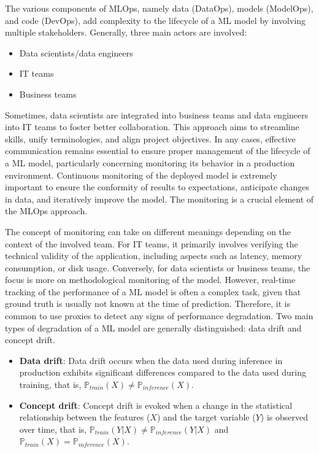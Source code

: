 The various components of MLOps, namely data (DataOps), models (ModelOps), and code (DevOps), add complexity to the lifecycle of a ML model by involving multiple stakeholders. Generally, three main actors are involved:

\begin{itemize}
    \item Data scientists/data engineers
    \item IT teams
    \item Business teams
\end{itemize}

Sometimes, data scientists are integrated into business teams and data engineers into IT teams to foster better collaboration. This approach aims to streamline skills, unify terminologies, and align project objectives. In any cases, effective communication remains essential to ensure proper management of the lifecycle of a ML model, particularly concerning monitoring its behavior in a production environment. Continuous monitoring of the deployed model is extremely important to ensure the conformity of results to expectations, anticipate changes in data, and iteratively improve the model. The monitoring is a crucial element of the MLOps approach.

The concept of monitoring can take on different meanings depending on the context of the involved team. For IT teams, it primarily involves verifying the technical validity of the application, including aspects such as latency, memory consumption, or disk usage. Conversely, for data scientists or business teams, the focus is more on methodological monitoring of the model. However, real-time tracking of the performance of a ML model is often a complex task, given that ground truth is usually not known at the time of prediction. Therefore, it is common to use proxies to detect any signs of performance degradation. Two main types of degradation of a ML model are generally distinguished: data drift and concept drift.

\begin{itemize}
    \item \textbf{Data drift}: Data drift occurs when the data used during inference in production exhibits significant differences compared to the data used during training, that is,  $\mathds{P}_{train}(X) \neq \mathds{P}_{inference}(X)$.
    \item \textbf{Concept drift}: Concept drift is evoked when a change in the statistical relationship between the features ($X$) and the target variable ($Y$) is observed over time, that is, $\mathds{P}_{train}(Y|X) \neq \mathds{P}_{inference}(Y|X)$ and $\mathds{P}_{train}(X) = \mathds{P}_{inference}(X)$.
\end{itemize}



